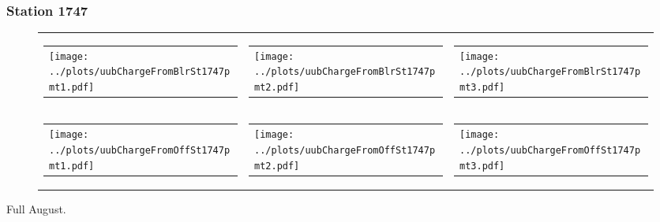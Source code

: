 \documentclass[aspectratio=169]{beamer}
\begin{document}
\begin{frame} 
  \frametitle{Station 1747}
 
  \begin{figure}
    \centering
    \begin{tabularx}{\textwidth}{LCR}
      \begin{tabular}{l}
        \texttt{[image: ../plots/uubChargeFromBlrSt1747pmt1.pdf]}
      \end{tabular}
      &
      \begin{tabular}{l}
        \texttt{[image: ../plots/uubChargeFromBlrSt1747pmt2.pdf]}
      \end{tabular}
      &
      \begin{tabular}{l}
        \texttt{[image: ../plots/uubChargeFromBlrSt1747pmt3.pdf]}
      \end{tabular}
      \\
      \begin{tabular}{l}
        \texttt{[image: ../plots/uubChargeFromOffSt1747pmt1.pdf]}
      \end{tabular}
      &
      \begin{tabular}{l}
        \texttt{[image: ../plots/uubChargeFromOffSt1747pmt2.pdf]}
      \end{tabular}
      &
      \begin{tabular}{l}
        \texttt{[image: ../plots/uubChargeFromOffSt1747pmt3.pdf]}
      \end{tabular}
    \end{tabularx}
  \end{figure}
  Full August. 
\end{frame}
\end{document}

